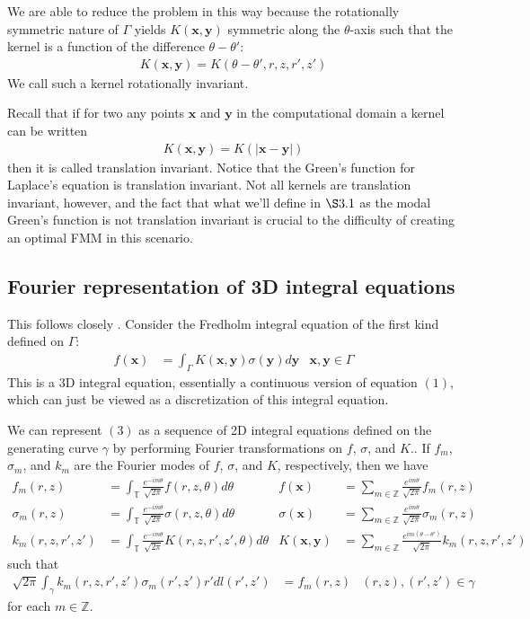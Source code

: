 \documentclass[11pt, oneside]{article}   	%
\begin{document}
We are able to reduce the problem in this way because the rotationally symmetric nature of $\Gamma$ yields $K(\mathbf{x},\mathbf{y})$ symmetric along the $\theta$-axis such that the kernel is a function of the difference $\theta-\theta'$:
\begin{align*}
K(\mathbf{x},\mathbf{y})=K(\theta-\theta',r,z,r',z')
\end{align*}
We call such a kernel rotationally invariant.

Recall that if for two any points $\mathbf{x}$ and $\mathbf{y}$ in the computational domain a kernel can be written
\begin{align*}
K(\mathbf{x},\mathbf{y}) = K(|\mathbf{x}-\mathbf{y}|)
\end{align*}
then it is called translation invariant. Notice that the Green's function for Laplace's equation is translation invariant. Not all kernels are translation invariant, however, and the fact that what we'll define in $\S3.1$ as the modal Green's function is not translation invariant is crucial to the difficulty of creating an optimal FMM in this scenario.

\subsection{Fourier representation of 3D integral equations}
This follows closely \cite{YYM}.
Consider the Fredholm integral equation of the first kind defined on $\Gamma$:
\begin{align}
f(\mathbf{x}) &= \int_\Gamma K(\mathbf{x},\mathbf{y})\sigma(\mathbf{y})d\mathbf{y} &\mathbf{x},\mathbf{y}\in\Gamma
\end{align}
This is a 3D integral equation, essentially a continuous version of equation $(1)$, which can just be viewed as a discretization of this integral equation.

We can represent $(3)$ as a sequence of 2D integral equations defined on the generating curve $\gamma$ by performing Fourier transformations on $f$, $\sigma$, and $K$.. If $f_m$, $\sigma_m$, and $k_m$ are the Fourier modes of $f$, $\sigma$, and $K$, respectively, then we have
\begin{align*}
f_m(r,z)&=\int_\mathbb{T}\frac{e^{-im\theta}}{\sqrt{2\pi}}f(r,z,\theta)d\theta&f(\mathbf{x})&=\sum_{m\in\mathbb{Z}}\frac{e^{im\theta}}{\sqrt{2\pi}}f_m(r,z)\\
\sigma_m(r,z)&=\int_\mathbb{T}\frac{e^{-im\theta}}{\sqrt{2\pi}}\sigma(r,z,\theta)d\theta&\sigma(\mathbf{x})&=\sum_{m\in\mathbb{Z}}\frac{e^{im\theta}}{\sqrt{2\pi}}\sigma_m(r,z)\\
k_m(r,z,r',z')&=\int_\mathbb{T}\frac{e^{-im\theta}}{\sqrt{2\pi}}K(r,z,r',z',\theta)d\theta&K(\mathbf{x},\mathbf{y})&=\sum_{m\in\mathbb{Z}}\frac{e^{im(\theta-\theta')}}{\sqrt{2\pi}}k_m(r,z,r',z')
\end{align*}
such that
\begin{align}
\sqrt{2\pi}\int_\gamma k_m(r,z,r',z')\sigma_m(r',z')r'dl(r',z')&=f_m(r,z) &(r,z),(r',z')\in\gamma
\end{align}
for each $m\in\mathbb{Z}$.
\end{document}
